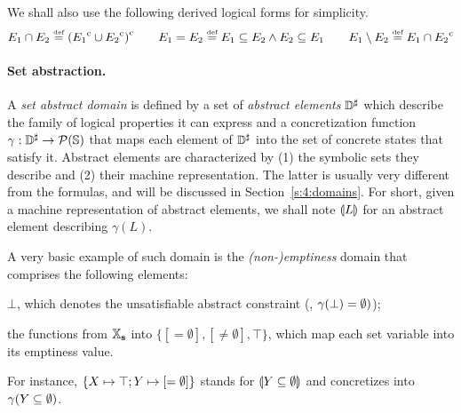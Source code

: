 We shall also use the following derived logical forms for simplicity.
\[
E_1 \cap E_2 \stackrel{\textrm{\tiny def}}{=} {({E_1}^{\mathrm{c}} \cup {E_2}^{\mathrm{c}})}^{\mathrm{c}}
\qquad
E_1 = E_2 \stackrel{\textrm{\tiny def}}{=} E_1 \subseteq E_2 \wedge E_2 \subseteq E_1
\qquad
E_1 \setminus E_2 \stackrel{\textrm{\tiny def}}{=} E_1 \cap {E_2}^{\mathrm{c}}
\]

\paragraph{Set abstraction.}
A {\em set abstract domain} is defined by a set of {\em abstract elements}
\( {\mathbb{D}}^{\sharp} \) which describe the family of logical properties it can
express and a concretization function \( \gamma: {\mathbb{D}}^{\sharp} \rightarrow
\mathcal{P}(\mathbb{S}) \) that maps each element of \( {\mathbb{D}}^{\sharp} \) into the set
of concrete states that satisfy it.
Abstract elements are characterized by
(1) the symbolic sets they describe and
(2) their machine representation.
The latter is usually very different from the formulas, and will be
discussed in Section~\ref{s:4:domains}.
For short, given a machine representation of abstract elements,
we shall note \( \llparenthesis L \rrparenthesis \) for an abstract element describing
\( \gamma( L ) \).
\begin{example}
  \label{ex:1:mt}
  A very basic example of such domain is the {\em (non-)emptiness} domain
  that comprises the following elements:
  \begin{compactitem}
  \item \( \bot \), which denotes the unsatisfiable abstract constraint
    (\ie, \( \gamma( \bot ) = \emptyset ) \));
  \item the functions from \( \mathbb{X}_{\bf s} \) into \( \{ [=\emptyset],
    [\not=\emptyset], \top \} \), which map each set variable into
    its emptiness value.
  \end{compactitem}
  For instance, \( \{ X \mapsto \top; Y \mapsto [=\emptyset] \} \)
  stands for \( \llparenthesis Y \subseteq \emptyset \rrparenthesis \) and concretizes into
  \( \gamma( Y \subseteq \emptyset ) \).
\end{example}


